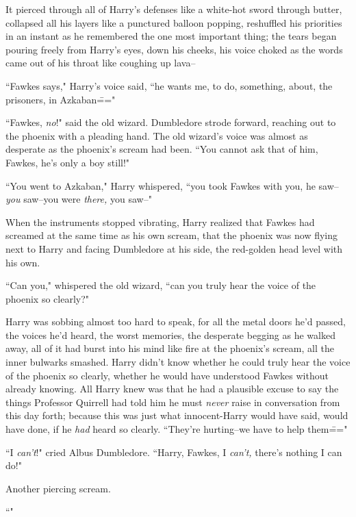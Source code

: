 It pierced through all of Harry's defenses like a white-hot sword through butter, collapsed all his layers like a punctured balloon popping, reshuffled his priorities in an instant as he remembered the one most important thing; the tears began pouring freely from Harry's eyes, down his cheeks, his voice choked as the words came out of his throat like coughing up lava\---

``Fawkes says," Harry's voice said, ``he wants me, to do, something, about, the prisoners, in Azkaban\==="

``Fawkes, \emph{no}!" said the old wizard. Dumbledore strode forward, reaching out to the phoenix with a pleading hand. The old wizard's voice was almost as desperate as the phoenix's scream had been. ``You cannot ask that of him, Fawkes, he's only a boy still!"

``You went to Azkaban," Harry whispered, ``you took Fawkes with you, he saw\---\emph{you} saw\---you were \emph{there,} you saw\---"

When the instruments stopped vibrating, Harry realized that Fawkes had screamed at the same time as his own scream, that the phoenix was now flying next to Harry and facing Dumbledore at his side, the red-golden head level with his own.

``Can you," whispered the old wizard, ``can you truly hear the voice of the phoenix so clearly?"

Harry was sobbing almost too hard to speak, for all the metal doors he'd passed, the voices he'd heard, the worst memories, the desperate begging as he walked away, all of it had burst into his mind like fire at the phoenix's scream, all the inner bulwarks smashed. Harry didn't know whether he could truly hear the voice of the phoenix so clearly, whether he would have understood Fawkes without already knowing. All Harry knew was that he had a plausible excuse to say the things Professor Quirrell had told him he must \emph{never} raise in conversation from this day forth; because this was just what innocent-Harry would have said, would have done, if he \emph{had} heard so clearly. ``They're hurting\---we have to help them\==="

``I \emph{can't}!" cried Albus Dumbledore. ``Harry, Fawkes, I \emph{can't,} there's nothing I can do!"

Another piercing scream.

``"

